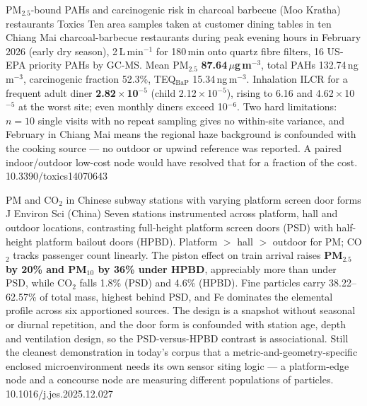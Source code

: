 \documentclass[10pt]{article}
\begin{document}
{PM$_{2.5}$-bound PAHs and carcinogenic risk in charcoal barbecue (Moo Kratha) restaurants}
{Toxics}
{Ten area samples taken at customer dining tables in ten Chiang Mai charcoal-barbecue
restaurants during peak evening hours in February 2026 (early dry season), 2\,L\,min$^{-1}$
for 180\,min onto quartz fibre filters, 16 US-EPA priority PAHs by GC-MS. Mean PM$_{2.5}$
\textbf{87.64\,$\mu$g\,m$^{-3}$}, total PAHs 132.74\,ng\,m$^{-3}$, carcinogenic fraction
52.3\%, TEQ$_{\mathrm{BaP}}$ 15.34\,ng\,m$^{-3}$. Inhalation ILCR for a frequent adult
diner \textbf{2.82\,$\times$\,10$^{-5}$} (child 2.12\,$\times$\,10$^{-5}$), rising to
6.16 and 4.62\,$\times$\,10$^{-5}$ at the worst site; even monthly diners exceed
10$^{-6}$. Two hard limitations: $n=10$ single visits with no repeat sampling gives no
within-site variance, and February in Chiang Mai means the regional haze background is
confounded with the cooking source --- no outdoor or upwind reference was reported.
A paired indoor/outdoor low-cost node would have resolved that for a fraction of the cost.}
{10.3390/toxics14070643}

{PM and CO$_2$ in Chinese subway stations with varying platform screen door forms}
{J Environ Sci (China)}
{Seven stations instrumented across platform, hall and outdoor locations, contrasting
full-height platform screen doors (PSD) with half-height platform bailout doors (HPBD).
Platform $>$ hall $>$ outdoor for PM; CO$_2$ tracks passenger count linearly. The piston
effect on train arrival raises \textbf{PM$_{2.5}$ by 20\% and PM$_{10}$ by 36\% under
HPBD}, appreciably more than under PSD, while CO$_2$ falls 1.8\% (PSD) and 4.6\% (HPBD).
Fine particles carry 38.22--62.57\% of total mass, highest behind PSD, and Fe dominates
the elemental profile across six apportioned sources. The design is a snapshot without
seasonal or diurnal repetition, and the door form is confounded with station age, depth
and ventilation design, so the PSD-versus-HPBD contrast is associational. Still the
cleanest demonstration in today's corpus that a metric-and-geometry-specific enclosed
microenvironment needs its own sensor siting logic --- a platform-edge node and a
concourse node are measuring different populations of particles.}
{10.1016/j.jes.2025.12.027}

\end{document}
